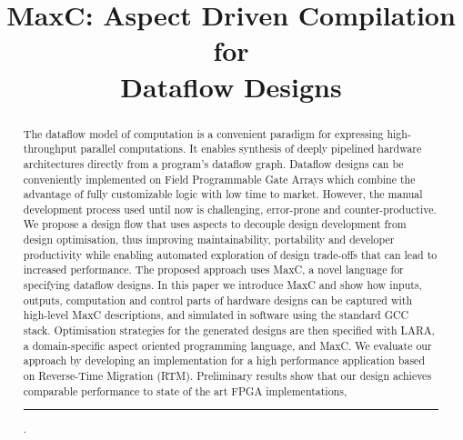 \documentclass[conference]{IEEEtran}
\newcommand\reduline{\bgroup\markoverwith
  {\textcolor{red}{\rule[-0.5ex]{2pt}{0.4pt}}}\ULon}
\newcommand{\FIC}[1]{\reduline{#1}}
\begin{document}
\captionsetup{width=2cm}



\title{MaxC: Aspect Driven Compilation for \\ Dataflow Designs}

\author{
  }

\maketitle


\begin{abstract}

  The dataflow model of computation is a convenient paradigm for
  expressing high-throughput parallel computations. It enables
  synthesis of deeply pipelined hardware architectures directly from a
  program's dataflow graph. Dataflow designs can be conveniently
  implemented on Field Programmable Gate Arrays which combine the
  advantage of fully customizable logic with low time to
  market. However, the manual development process used until now is
  challenging, error-prone and counter-productive. We propose a design
  flow that uses aspects to decouple design development from design
  optimisation, thus improving maintainability, portability and
  developer productivity while enabling automated exploration of
  design trade-offs that can lead to increased performance. The
  proposed approach uses MaxC, a novel language for specifying
  dataflow designs. In this paper we introduce MaxC and show how
  inputs, outputs, computation and control parts of hardware designs
  can be captured with high-level MaxC descriptions, and simulated in
  software using the standard GCC stack. Optimisation strategies for
  the generated designs are then specified with LARA, a
  domain-specific aspect oriented programming language, and MaxC. We
  evaluate our approach by developing an implementation for a high
  performance application based on Reverse-Time Migration
  (RTM). Preliminary results show that our design achieves comparable
  performance to state of the art FPGA implementations, \FIC{while
  improving developer productivity}.

\end{abstract}
\end{document}
